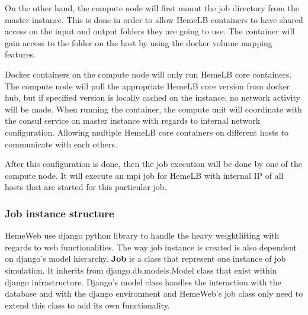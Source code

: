 On the other hand, the compute node will first mount the job directory from the master instance. This is done in order to allow HemeLB containers to have shared access on the input and output folders they are going to use. The container will gain access to the folder on the host by using the docker volume mapping features.

Docker containers on the compute node will only run HemeLB core containers. The compute node will pull the appropriate HemeLB core version from docker hub, but if specified version is locally cached on the instance, no network activity will be made. When running the container, the compute unit will coordinate with the consul service on master instance with regards to internal network configuration. Allowing multiple HemeLB core containers on different hosts to communicate with each others. 

After this configuration is done, then the job execution will be done by one of the compute node. It will execute an mpi job for HemeLB with internal IP of all hosts that are started for this particular job.


\subsubsection{Job instance structure}
HemeWeb use django python library to handle the heavy weightlifting with regards to web functionalities. The way job instance is created is also dependent on django's model hierarchy. \textbf{Job} is a class that represent one instance of job simulation. It inherits from django.db.models.Model class that exist within django infrastructure. Django's model class handles the interaction with the database and with the django environment and HemeWeb's job class only need to extend this class to add its own functionality.

